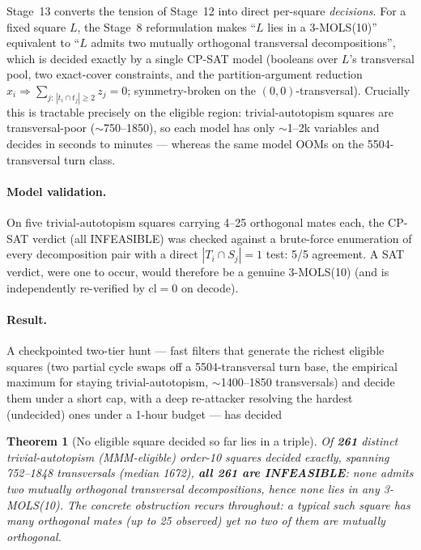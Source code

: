 \documentclass[11pt,a4paper]{article}
\newtheorem{theorem}{Theorem}[section]
\theoremstyle{remark}
\newcommand{\cl}{\mathrm{cl}}
\begin{document}
Stage~13 converts the tension of Stage~12 into direct per-square
\emph{decisions}. For a fixed square $L$, the Stage~8 reformulation makes
``$L$ lies in a 3-MOLS(10)'' equivalent to ``$L$ admits two mutually
orthogonal transversal decompositions'', which is decided exactly by a
single CP-SAT model (booleans over $L$'s transversal pool, two exact-cover
constraints, and the partition-argument reduction
$x_i \Rightarrow \sum_{j:\,|t_i\cap t_j|\geq2} z_j = 0$; symmetry-broken on
the $(0,0)$-transversal). Crucially this is tractable precisely on the
eligible region: trivial-autotopism squares are transversal-poor
($\sim$750--1850), so each model has only $\sim$1--2k variables and decides
in seconds to minutes --- whereas the same model OOMs on the 5504-transversal
turn class.

\paragraph{Model validation.} On five trivial-autotopism squares carrying
4--25 orthogonal mates each, the CP-SAT verdict (all INFEASIBLE) was checked
against a brute-force enumeration of every decomposition pair with a direct
$|T_i\cap S_j|=1$ test: 5/5 agreement. A SAT verdict, were one to occur,
would therefore be a genuine 3-MOLS(10) (and is independently re-verified by
$\cl=0$ on decode).

\paragraph{Result.} A checkpointed two-tier hunt --- fast filters that
generate the richest eligible squares (two partial cycle swaps off a
5504-transversal turn base, the empirical maximum for staying
trivial-autotopism, $\sim$1400--1850 transversals) and decide them under a
short cap, with a deep re-attacker resolving the hardest (undecided) ones
under a 1-hour budget --- has decided

\begin{theorem}[No eligible square decided so far lies in a triple]
\label{thm:decisions}
Of \textbf{261} distinct trivial-autotopism (MMM-eligible) order-10 squares
decided exactly, spanning 752--1848 transversals (median 1672), \textbf{all
261 are INFEASIBLE}: none admits two mutually orthogonal transversal
decompositions, hence none lies in any 3-MOLS(10). The concrete obstruction
recurs throughout: a typical such square has many orthogonal mates (up to 25
observed) yet no two of them are mutually orthogonal.
\end{theorem}
\end{document}
